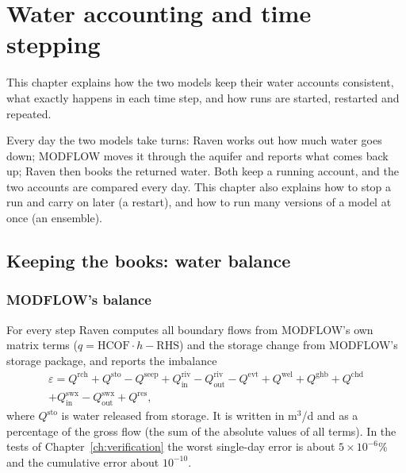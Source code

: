 \chapter{Water accounting and time stepping}\label{ch:c5}
This chapter explains how the two models keep their water accounts consistent, what exactly happens in each time step,
and how runs are started, restarted and repeated.

\begin{plain}
Every day the two models take turns: Raven works out how much water goes down; MODFLOW moves it through the aquifer and
reports what comes back up; Raven then books the returned water. Both keep a running account, and the two accounts are
compared every day. This chapter also explains how to stop a run and carry on later (a restart), and how to run many
versions of a model at once (an ensemble).
\end{plain}

\section{Keeping the books: water balance}\label{ch:balance}
\subsection{MODFLOW's balance}
For every step Raven computes all boundary flows from MODFLOW's own matrix terms ($q=\mathrm{HCOF}\cdot h-\mathrm{RHS}$)
and the storage change from MODFLOW's storage package, and reports the imbalance
\begin{multline}
\varepsilon=Q^{\mathrm{rch}}+Q^{\mathrm{sto}}-Q^{\mathrm{seep}}+Q^{\mathrm{riv}}_{\mathrm{in}}-Q^{\mathrm{riv}}_{\mathrm{out}}-Q^{\mathrm{evt}}
+Q^{\mathrm{wel}}+Q^{\mathrm{ghb}}+Q^{\mathrm{chd}}\\+Q^{\mathrm{swx}}_{\mathrm{in}}-Q^{\mathrm{swx}}_{\mathrm{out}}+Q^{\mathrm{res}},
\end{multline}
where $Q^{\mathrm{sto}}$ is water released from storage. It is written in m$^3$/d and as a percentage of the gross flow
(the sum of the absolute values of all terms). In the tests of Chapter~\ref{ch:verification} the worst single-day error is about $5\times10^{-6}$\% and the
cumulative error about $10^{-10}$.


